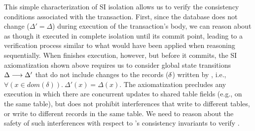 
\noindent This simple characterization of SI isolation allows us to
verify the consistency conditions associated with the 
transaction.  First, since the database does not change ($\Delta' =
\Delta$) during execution of the transaction's body, we can reason
about  as though it executed in complete isolation until
its commit point, leading to a verification process similar to what
would have been applied when reasoning sequentially.  When
 finishes execution, however, but before it commits, the
SI axiomatization shown above requires us to consider global state
transitions $\Delta \longrightarrow \Delta'$ that do not include changes
to the records ($\delta$) written by , i.e.,
$\forall(x\in\mathit{dom}(\delta)).~\Delta'(x) = \Delta(x)$.  The
axiomatization precludes any execution in which there are concurrent
updates to shared table fields (e.g.,  on the same
 table), but does not prohibit interferences that write to
different tables, or write to different records in the same table.  We
need to reason about the safety of such interferences with respect to
's consistency invariants to verify .

